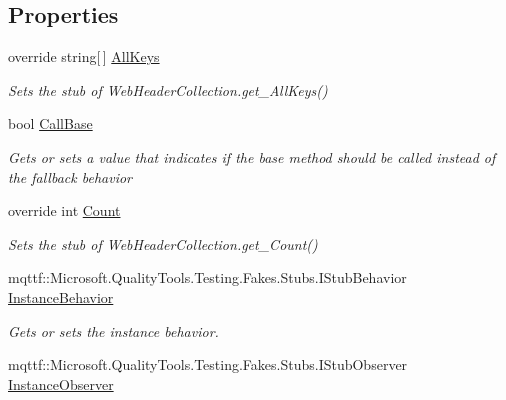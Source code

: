 \subsection*{Properties}
\begin{DoxyCompactItemize}
\item 
override string\mbox{[}$\,$\mbox{]} \hyperlink{class_system_1_1_net_1_1_fakes_1_1_stub_web_header_collection_a5d26cfd7a154ee368b3f6d3ce3a7feea}{All\-Keys}
\begin{DoxyCompactList}\small\item\em Sets the stub of Web\-Header\-Collection.\-get\-\_\-\-All\-Keys()\end{DoxyCompactList}\item 
bool \hyperlink{class_system_1_1_net_1_1_fakes_1_1_stub_web_header_collection_a9b456f161169cb46f3255a7677e12a6f}{Call\-Base}
\begin{DoxyCompactList}\small\item\em Gets or sets a value that indicates if the base method should be called instead of the fallback behavior\end{DoxyCompactList}\item 
override int \hyperlink{class_system_1_1_net_1_1_fakes_1_1_stub_web_header_collection_a2690c13bc8d9c469a384462603f81705}{Count}
\begin{DoxyCompactList}\small\item\em Sets the stub of Web\-Header\-Collection.\-get\-\_\-\-Count()\end{DoxyCompactList}\item 
mqttf\-::\-Microsoft.\-Quality\-Tools.\-Testing.\-Fakes.\-Stubs.\-I\-Stub\-Behavior \hyperlink{class_system_1_1_net_1_1_fakes_1_1_stub_web_header_collection_ab4f9942261585fd109c6e9599f9464b0}{Instance\-Behavior}
\begin{DoxyCompactList}\small\item\em Gets or sets the instance behavior.\end{DoxyCompactList}\item 
mqttf\-::\-Microsoft.\-Quality\-Tools.\-Testing.\-Fakes.\-Stubs.\-I\-Stub\-Observer \hyperlink{class_system_1_1_net_1_1_fakes_1_1_stub_web_header_collection_aa13ccfde0b54d8cd8bef4175a2c414b3}{Instance\-Observer}

\end{DoxyCompactItemize}

